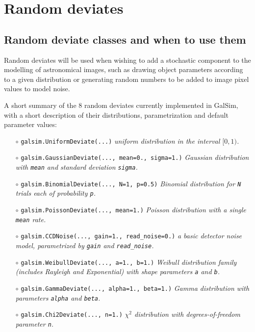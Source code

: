 \documentclass[preprint,11pt]{aastex}
\begin{document}
\section{Random deviates}\label{sect:random}
\subsection{Random deviate classes and when to use them}
Random deviates will be used when wishing to add a stochastic
component to the modelling of astronomical images, such as drawing
object parameters according to a given distribution or generating random
numbers to be added to image pixel values to model noise. 

A short summary of the 8 random deviates currently implemented in GalSim,
with a short description of their distributions, parametrization and
default parameter values:
\begin{itemize}

\item[$\circ$] \texttt{galsim.UniformDeviate(...)} \newline \emph{uniform distribution in the
  interval $[0, 1)$.}

\item[$\circ$] \texttt{galsim.GaussianDeviate(..., mean=0., sigma=1.)} \newline \emph{Gaussian distribution
with \texttt{mean} and standard deviation \texttt{sigma}.}

\item[$\circ$] \texttt{galsim.BinomialDeviate(..., N=1, p=0.5)} \newline \emph{Binomial
    distribution for \texttt{N} trials each of probability \texttt{p}.}

\item[$\circ$] \texttt{galsim.PoissonDeviate(..., mean=1.)} \newline \emph{Poisson distribution
    with a single \texttt{mean} rate.}

\item[$\circ$] \texttt{galsim.CCDNoise(..., gain=1., read\_noise=0.)}  \newline \emph{a
    basic detector noise model, parametrized by \texttt{gain} and \texttt{read\_noise}.}

\item[$\circ$] \texttt{galsim.WeibullDeviate(..., a=1., b=1.)} \newline \emph{Weibull distribution
    family (includes Rayleigh and Exponential) with shape parameters \texttt{a} and \texttt{b}.}

\item[$\circ$] \texttt{galsim.GammaDeviate(..., alpha=1., beta=1.)} \newline \emph{Gamma distribution with
    parameters \texttt{alpha} and \texttt{beta}.}

\item[$\circ$] \texttt{galsim.Chi2Deviate(..., n=1.)} \newline \emph{$\chi^2$ distribution
    with degrees-of-freedom parameter \texttt{n}.}

\end{itemize}
\end{document}
